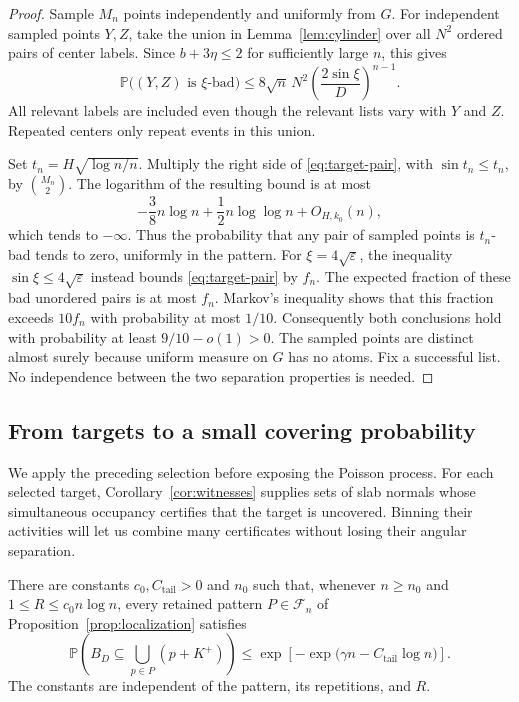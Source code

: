 \begin{proof}
Sample $M_n$ points independently and uniformly from $G$.
For independent sampled points $Y,Z$, take the union in
Lemma~\ref{lem:cylinder} over all $N^2$ ordered pairs of center labels.
Since $b+3\eta\le2$ for sufficiently large $n$, this gives
\begin{equation}
 \mathbb P\bigl((Y,Z)\text{ is $\xi$-bad}\bigr)
 \le8\sqrt n\,N^2
       \left(\frac{2\sin\xi}{D}\right)^{n-1}.
\label{eq:target-pair}
\end{equation}
All relevant labels are included even though the relevant lists vary
with $Y$ and $Z$.  Repeated centers only repeat events in this union.

Set $t_n=H\sqrt{\log n/n}$.  Multiply the right side of
\eqref{eq:target-pair}, with $\sin t_n\le t_n$, by
$\binom{M_n}{2}$.  The logarithm of the resulting bound is at most
\[
 -\frac38n\log n+\frac12n\log\log n+O_{H,k_0}(n),
\]
which tends to $-\infty$.  Thus the probability that any pair of
sampled points is $t_n$-bad tends to zero, uniformly in the pattern.
For $\xi=4\sqrt\varepsilon$, the inequality
$\sin\xi\le4\sqrt\varepsilon$ instead bounds
\eqref{eq:target-pair} by $f_n$.
The expected fraction of these bad unordered pairs is at most $f_n$.
Markov's inequality shows that this fraction exceeds $10f_n$ with
probability at most $1/10$.
Consequently both conclusions hold with probability at least
$9/10-o(1)>0$.  The sampled points are distinct almost surely because
uniform measure on $G$ has no atoms.  Fix a successful list.
No independence between the two separation properties is needed.
\end{proof}

\subsection{From targets to a small covering probability}

We apply the preceding selection before exposing the Poisson process.
For each selected target, Corollary~\ref{cor:witnesses} supplies sets of
slab normals whose simultaneous occupancy certifies that the target is
uncovered.  Binning their activities will let us combine many certificates
without losing their angular separation.

\begin{proposition}
\label{prop:pattern-tail}
There are constants $c_0,C_{\mathrm{tail}}>0$ and $n_0$ such that, whenever
$n\ge n_0$ and $1\le R\le c_0n\log n$, every retained pattern
$P\in\mathcal F_n$ of Proposition~\ref{prop:localization} satisfies
\begin{equation}
 \mathbb P\left(B_D\subseteq\bigcup_{p\in P}(p+K^+)\right)
 \le \exp\left[-\exp\bigl(\gamma n-C_{\mathrm{tail}}\log n\bigr)\right].
\label{eq:pattern-tail}
\end{equation}
The constants are independent of the pattern, its repetitions, and $R$.
\end{proposition}

